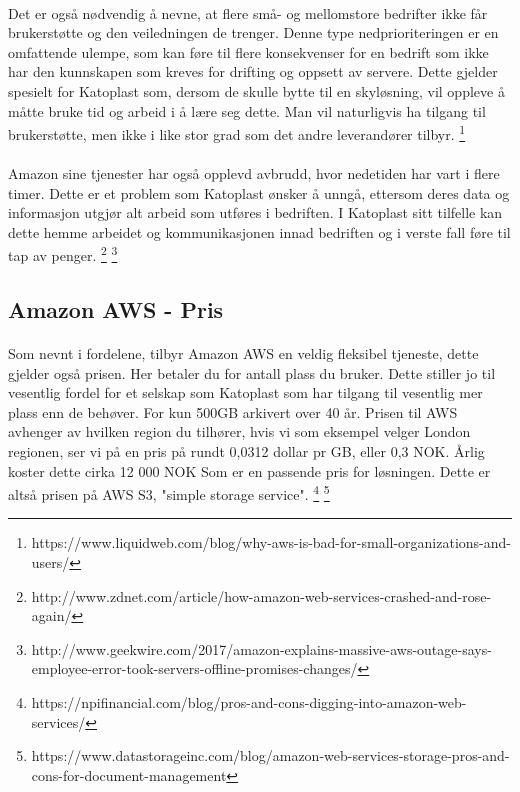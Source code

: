 \paragraph{} Det er også nødvendig å nevne, at flere små- og mellomstore bedrifter ikke får brukerstøtte og den veiledningen de trenger. Denne type nedprioriteringen er en omfattende ulempe, som kan føre til flere konsekvenser for en bedrift som ikke har den kunnskapen som kreves for drifting og oppsett av servere. Dette gjelder spesielt for Katoplast som, dersom de skulle bytte til en skyløsning, vil oppleve å måtte bruke tid og arbeid i å lære seg dette. Man vil naturligvis ha tilgang til brukerstøtte, men ikke i like stor grad som det andre leverandører tilbyr.
\footnote{https://www.liquidweb.com/blog/why-aws-is-bad-for-small-organizations-and-users/}


\paragraph{} Amazon sine tjenester har også opplevd avbrudd, hvor nedetiden har vart i flere timer. Dette er et problem som Katoplast ønsker å unngå, ettersom deres data og informasjon utgjør alt arbeid som utføres i bedriften. I Katoplast sitt tilfelle kan dette hemme arbeidet og kommunikasjonen innad bedriften og i verste fall føre til tap av penger.
\footnote{http://www.zdnet.com/article/how-amazon-web-services-crashed-and-rose-again/}
\footnote{http://www.geekwire.com/2017/amazon-explains-massive-aws-outage-says-employee-error-took-servers-offline-promises-changes/}

\subsection{Amazon AWS - Pris}
\paragraph{} Som nevnt i fordelene, tilbyr Amazon AWS en veldig fleksibel tjeneste, dette gjelder også prisen. Her betaler du for antall plass du bruker. Dette stiller jo til vesentlig fordel for et selskap som Katoplast som har tilgang til vesentlig mer plass enn de behøver. For kun 500GB arkivert over 40 år. Prisen til AWS avhenger av hvilken region du tilhører, hvis vi som eksempel velger London regionen, ser vi på en pris på rundt 0,0312 dollar pr GB, eller 0,3 NOK. Årlig koster dette cirka 12 000 NOK Som er en passende pris for løsningen. Dette er altså prisen på AWS S3, "simple storage service".
\footnote{https://npifinancial.com/blog/pros-and-cons-digging-into-amazon-web-services/}
\footnote{https://www.datastorageinc.com/blog/amazon-web-services-storage-pros-and-cons-for-document-management}

